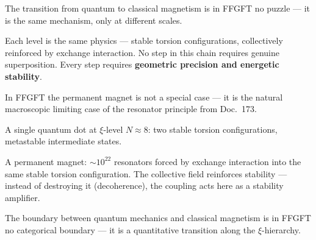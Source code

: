 The transition from quantum to classical magnetism
is in FFGFT no puzzle --- it is the same mechanism,
only at different scales.

\begin{center}
\end{center}

Each level is the same physics --- stable torsion configurations,
collectively reinforced by exchange interaction.
No step in this chain requires genuine superposition.
Every step requires \textbf{geometric precision and
energetic stability}.

\begin{foundation}
In FFGFT the permanent magnet is not a special case ---
it is the natural macroscopic limiting case
of the resonator principle from Doc.~173.

A single quantum dot at $\xi$-level $N \approx 8$:
two stable torsion configurations, metastable intermediate states.

A permanent magnet:
$\sim 10^{22}$ resonators forced by exchange interaction
into the same stable torsion configuration.
The collective field reinforces stability --- instead of destroying it
(decoherence), the coupling acts here as a
stability amplifier.

The boundary between quantum mechanics and classical magnetism
is in FFGFT no categorical boundary ---
it is a quantitative transition along the $\xi$-hierarchy.
\end{foundation}

